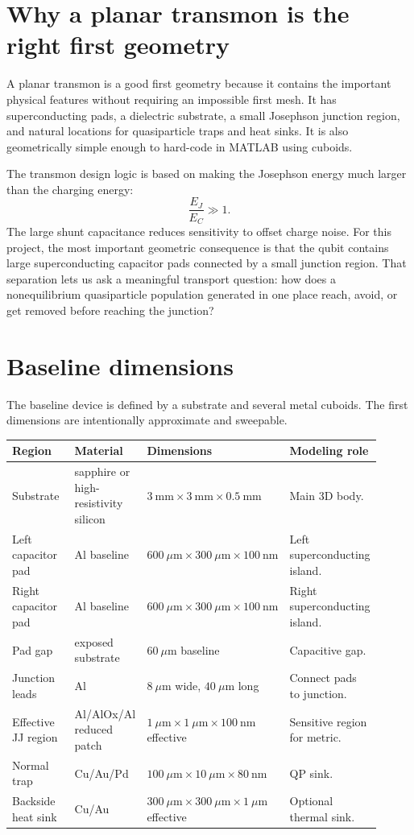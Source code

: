 \documentclass[11pt]{article}
\begin{document}
\section{Why a planar transmon is the right first geometry}
A planar transmon is a good first geometry because it contains the important physical features without requiring an impossible first mesh. It has superconducting pads, a dielectric substrate, a small Josephson junction region, and natural locations for quasiparticle traps and heat sinks. It is also geometrically simple enough to hard-code in MATLAB using cuboids.

The transmon design logic is based on making the Josephson energy much larger than the charging energy:
\begin{equation}
\frac{E_J}{E_C}\gg 1.
\end{equation}
The large shunt capacitance reduces sensitivity to offset charge noise. For this project, the most important geometric consequence is that the qubit contains large superconducting capacitor pads connected by a small junction region. That separation lets us ask a meaningful transport question: how does a nonequilibrium quasiparticle population generated in one place reach, avoid, or get removed before reaching the junction?

\section{Baseline dimensions}
The baseline device is defined by a substrate and several metal cuboids. The first dimensions are intentionally approximate and sweepable.

\begin{longtable}{p{0.23\linewidth} p{0.20\linewidth} p{0.26\linewidth} p{0.22\linewidth}}
\toprule
\textbf{Region} & \textbf{Material} & \textbf{Dimensions} & \textbf{Modeling role}\\
\midrule
Substrate & sapphire or high-resistivity silicon & $3~\mathrm{mm}\times3~\mathrm{mm}\times0.5~\mathrm{mm}$ & Main 3D body.\\
Left capacitor pad & Al baseline & $600~\mu\mathrm{m}\times300~\mu\mathrm{m}\times100~\mathrm{nm}$ & Left superconducting island.\\
Right capacitor pad & Al baseline & $600~\mu\mathrm{m}\times300~\mu\mathrm{m}\times100~\mathrm{nm}$ & Right superconducting island.\\
Pad gap & exposed substrate & $60~\mu\mathrm{m}$ baseline & Capacitive gap.\\
Junction leads & Al & $8~\mu\mathrm{m}$ wide, $40~\mu\mathrm{m}$ long & Connect pads to junction.\\
Effective JJ region & Al/AlOx/Al reduced patch & $1~\mu\mathrm{m}\times1~\mu\mathrm{m}\times100~\mathrm{nm}$ effective & Sensitive region for metric.\\
Normal trap & Cu/Au/Pd & $100~\mu\mathrm{m}\times10~\mu\mathrm{m}\times80~\mathrm{nm}$ & QP sink.\\
Backside heat sink & Cu/Au & $300~\mu\mathrm{m}\times300~\mu\mathrm{m}\times1~\mu\mathrm{m}$ effective & Optional thermal sink.\\
\bottomrule
\end{longtable}
\end{document}

